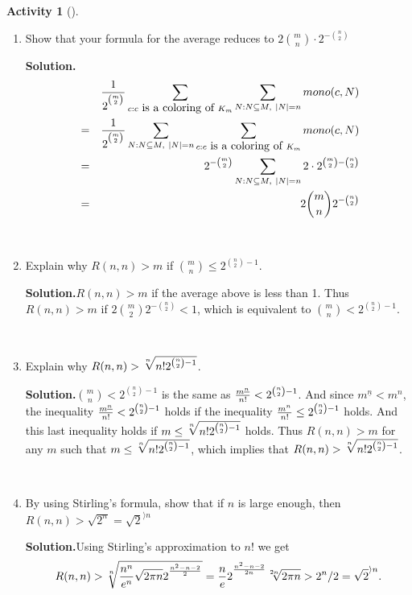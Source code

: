 \documentclass[10pt,]{book}
\theoremstyle{plain}
\theoremstyle{definition}
\newtheorem{activity}[project]{Activity}
\numberwithin{equation}{chapter}
\newcommand{\lt}{<}
\newcommand{\amp}{&}
\begin{document}
\begin{activity}[]
\begin{enumerate}[label=(\alph*)]
~\par
\item Show that your formula for the average reduces to \(2{m\choose
n}\cdot2^{-{n\choose 2}}\)%
\par\medskip\noindent%
\textbf{Solution.}\quad %
\begin{align*}
\amp \amp {1\over 2^{^{m\choose 2}}}\sum_{c:c\mbox{~is a coloring
of~} K_m}\sum_{N:N\subseteq M,~|N|=n}{ mono}(c,N)\\
\amp =\amp {1\over 2^{^{m\choose 2}}} \sum_{N:N\subseteq
M,~|N|=n}\sum_{c:c\mbox{~is a coloring of~} K_m}{ mono}(c,N)\\
\amp =\amp
2^{-{m\choose2}}\sum_{N:N\subseteq
M,~|N|=n}2\cdot2^{{m\choose2}-{n\choose2}}\\
\amp =\amp  2{m\choose n}2^{-{n\choose 2}}
\end{align*}

~\par
\item Explain why \(R(n,n)>m\) if \({m\choose n}\le 2^{{n\choose 2} -1}\).%
\par\medskip\noindent%
\textbf{Solution.}\quad \(R(n,n)>m\) if the average above is less than 1. Thus \(R(n,n)>m\) if \(2{m\choose 2}2^{-{n\choose 2}}\lt 1\), which is equivalent to \({m\choose n}\lt 2^{{n\choose 2}-1}\).%

~\par
\item Explain why \(R(n,n)>\root n \of {n!2^{{n\choose 2}-1}}\).%
\par\medskip\noindent%
\textbf{Solution.}\quad \({m\choose n} \lt 2^{{n\choose 2}-1}\) is the same as \({m^{\underline{n}}\over n!}\lt 2^{{n\choose 2}-1}\). And since \(m^{\underline{n}}\lt m^n\), the inequality \({m^{\underline{n}}\over
n!}\lt  2^{{n\choose 2}-1}\) holds if the inequality \({m^n\over
n!}\le2^{{n\choose2}-1}\) holds. And this last inequality holds if \(m\le\root n
\of {n!2^{{n\choose2}-1}}\) holds. Thus \(R(n,n)>m\) for any \(m\) such that \(m\le\root n
\of {n!2^{{n\choose2}-1}}\), which implies that \(R(n,n)> \root n
\of {n!2^{{n\choose2}-1}}\).%

~\par
\item By using Stirling's formula, show that if \(n\) is large enough, then \(R(n,n) > \sqrt{2^n} = \sqrt{2}^{\rangle n}\)%
\par\medskip\noindent%
\textbf{Solution.}\quad Using Stirling's approximation to \(n!\) we get%
\begin{equation*}
R(n,n)>\root n \of
{{n^n\over e^n}\sqrt{2\pi n}2^{^{n^2-n-2\over 2}}}={n\over
e}2^{^{n^2-n-2\over 2n}}\root 2n \of{2\pi
n}>2^n/2=\sqrt{2}^{\rangle n}.
\end{equation*}
%

\end{enumerate}
\end{activity}
\typeout{************************************************}
\typeout{************************************************}
\end{document}
